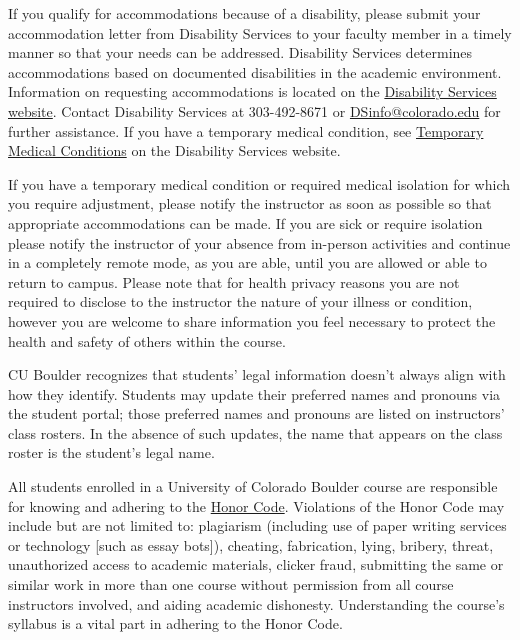 \item[Accommodation for Disabilities, Temporary Medical Conditions, and Medical Isolation:] 
If you qualify for accommodations because of a disability, please submit your accommodation letter from Disability Services to your faculty member in a timely manner so that your needs can be addressed.  Disability Services determines accommodations based on documented disabilities in the academic environment. Information on requesting accommodations is located on the \href{https://www.colorado.edu/disabilityservices/}{Disability Services website}. Contact Disability Services at 303-492-8671 or \href{mailto:mailto:DSinfo@colorado.edu}{DSinfo@colorado.edu} for further assistance.  If you have a temporary medical condition, see \href{https://www.colorado.edu/disabilityservices/students/temporary-medical-conditions}{Temporary Medical Conditions} on the Disability Services website.
  
If you have a temporary medical condition or required medical isolation for which you require adjustment, please notify the instructor as soon as possible so that appropriate accommodations can be made.
If you are sick or require isolation please notify the instructor of your absence from in-person activities and continue in a completely remote mode, as you are able, until you are allowed or able to return to campus.
Please note that for health privacy reasons you are not required to disclose to the instructor the nature of your illness or condition, however you are welcome to share information you feel necessary to protect the health and safety of others within the course.
 
\item[Preferred Student Names and Pronouns:]
CU Boulder recognizes that students' legal information doesn't always align with how they identify. 
Students may update their preferred names and pronouns via the student portal; those preferred names and pronouns are listed on instructors' class rosters. 
In the absence of such updates, the name that appears on the class roster is the student's legal name.

\item[Honor Code:] 
All students enrolled in a University of Colorado Boulder course are responsible for knowing and adhering to the  \href{https://www.colorado.edu/sccr/honor-code}{Honor Code}. Violations of the Honor Code may include but are not limited to: plagiarism (including use of paper writing services or technology [such as essay bots]), cheating, fabrication, lying, bribery, threat, unauthorized access to academic materials, clicker fraud, submitting the same or similar work in more than one course without permission from all course instructors involved, and aiding academic dishonesty. Understanding the course's syllabus is a vital part in adhering to the Honor Code.

